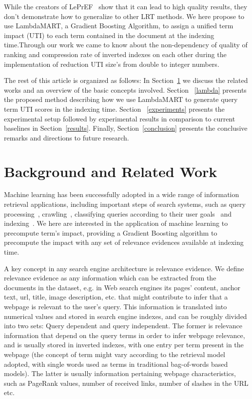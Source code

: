 \documentclass[preprint,12pt,3p]{elsarticle}
\begin{document}
While the creators of LePrEF~\cite{costa2012lepref} show that it can lead to high quality results, they don't demonstrate how to generalize to other LRT methods. We here propose to use LambdaMART, a Gradient Boosting Algorithm, to assign a unified term impact (UTI) to each term contained in the document at the indexing time.Through our work we came to know about the non-dependency of quality of ranking and compression rate of inverted indexes on each other during the implementation of reduction UTI size's from double to integer numbers.

The rest of this article is organized as follows: In Section~\ref{relatedwork} we discuss the related works and an overview of the basic concepts involved. Section ~\ref{lambda} presents the proposed method describing how we use LambdaMART to generate query term UTI scores in the indexing time. Section ~\ref{experiments} presents the experimental setup followed by experimental results in comparison to current baselines in Section~\ref{results}. Finally, Section~\ref{conclusion} presents the conclusive remarks and directions to future research.

\section{Background and Related Work}
\label{relatedwork}

Machine learning has been successfully adopted in a wide range of information retrieval applications, including important steps of search systems, such as query processing~\cite{de2007combined,fan2004effects,freund2003efficient,joachims2002optimizing}, crawling~\cite{Santos2015}, classifying queries according to their user goals~\cite{herrera2010exploring} and indexing~\cite{costa2012lepref}. We here are interested in the application of machine learning to precompute term's impact, providing a Gradient Boosting algorithm to precompute the impact with any set of relevance evidences available at indexing time.

A key concept in any search engine architecture is relevance evidence. We define relevance evidence as any information which can be extracted from the documents in the dataset, e.g. in Web search engines its pages' content, anchor text, url, title, image description, etc. that might contribute to infer that a webpage is relevant to the user's query. This information is translated into numerical values and stored in search engine indexes, and can be roughly divided into two sets: Query dependent and query independent. The former is relevance information that depend on the query terms in order to infer webpage relevance, and is usually stored in inverted indexes, with one entry per term present in the webpage (the concept of term might vary according to the retrieval model adopted, with single words used as terms in traditional bag-of-words based models). The latter is usually information pertaining webpage characteristics, such as PageRank values, number of received links, number of slashes in the URL etc.
\end{document}
